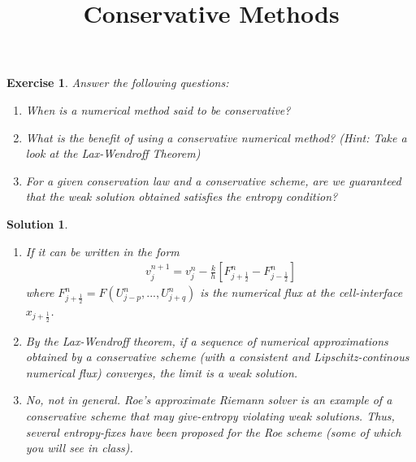 \documentclass[10pt,letterpaper]{article}
\newcommand{\jph}{{j+\frac{1}{2}}}
\newcommand{\jmh}{{j-\frac{1}{2}}}
\theoremstyle{break}
\newtheorem{exercise}{Exercise}
\newtheorem{mysolution}{Solution}
\newenvironment{solution}{\begin{mysolution}}{\end{mysolution}}
\begin{document}
\title{Conservative Methods}
\date{}

\maketitle















\begin{exercise}
	Answer the following questions:
	\begin{enumerate}
		\item
		When is a numerical method said to be conservative?

		\item
		What is the benefit of using a conservative numerical method? (Hint: Take a look at the Lax-Wendroff Theorem)

		\item
		For a given conservation law and a conservative scheme, are we guaranteed that the weak solution obtained satisfies the entropy condition?
	\end{enumerate}
\end{exercise}

\begin{solution}
	\begin{enumerate}
		\item
		If it can be written in the form
		\begin{gather} \label{consForm}
			v_{j}^{n+1}=v_{j}^{n}-\frac{k}{h}\left[F^n_\jph-F^n_\jmh\right]
		\end{gather}
		where $F^n_\jph = F(U^n_{j-p},...,U^n_{j+q})$ is the numerical flux at the cell-interface $x_\jph$. 
		
		\item
		By the Lax-Wendroff theorem, if a sequence of numerical approximations obtained by a conservative scheme (with a consistent and Lipschitz-continous numerical flux) converges, the limit is a weak solution.
		
		\item
		No, not in general. Roe's approximate Riemann solver is an example of a conservative scheme that may give-entropy violating weak solutions. Thus, several \textit{entropy-fixes} have been proposed for the Roe scheme (some of which you will see in class).
	\end{enumerate}
\end{solution}
\end{document}
